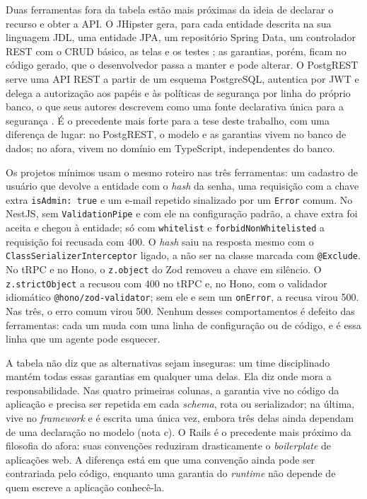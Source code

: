 \documentclass[a4paper,12pt]{article}
\newcommand{\estr}[1]{\textit{#1}}
\begin{document}
Duas ferramentas fora da tabela estão mais próximas da ideia de declarar o recurso e obter a API. O JHipster gera, para cada entidade descrita na sua linguagem JDL, uma entidade JPA, um repositório Spring Data, um controlador REST com o CRUD básico, as telas e os testes \citep{jhipster2026}; as garantias, porém, ficam no código gerado, que o desenvolvedor passa a manter e pode alterar. O PostgREST serve uma API REST a partir de um esquema PostgreSQL, autentica por JWT e delega a autorização aos papéis e às políticas de segurança por linha do próprio banco, o que seus autores descrevem como uma fonte declarativa única para a segurança \citep{postgrest2026}. É o precedente mais forte para a tese deste trabalho, com uma diferença de lugar: no PostgREST, o modelo e as garantias vivem no banco de dados; no afora, vivem no domínio em TypeScript, independentes do banco.

Os projetos mínimos usam o mesmo roteiro nas três ferramentas: um cadastro de usuário que devolve a entidade com o \estr{hash} da senha, uma requisição com a chave extra \texttt{isAdmin: true} e um e-mail repetido sinalizado por um \texttt{Error} comum. No NestJS, sem \texttt{ValidationPipe} e com ele na configuração padrão, a chave extra foi aceita e chegou à entidade; só com \texttt{whitelist} e \texttt{forbidNonWhitelisted} a requisição foi recusada com 400. O \estr{hash} saiu na resposta mesmo com o \texttt{ClassSerializerInterceptor} ligado, a não ser na classe marcada com \texttt{@Exclude}. No tRPC e no Hono, o \texttt{z.object} do Zod removeu a chave em silêncio. O \texttt{z.strictObject} a recusou com 400 no tRPC e, no Hono, com o validador idiomático \texttt{@hono/zod-validator}; sem ele e sem um \texttt{onError}, a recusa virou 500. Nas três, o erro comum virou 500. Nenhum desses comportamentos é defeito das ferramentas: cada um muda com uma linha de configuração ou de código, e é essa linha que um agente pode esquecer.

A tabela não diz que as alternativas sejam inseguras: um time disciplinado mantém todas essas garantias em qualquer uma delas. Ela diz onde mora a responsabilidade. Nas quatro primeiras colunas, a garantia vive no código da aplicação e precisa ser repetida em cada \estr{schema}, rota ou serializador; na última, vive no \estr{framework} e é escrita uma única vez, embora três delas ainda dependam de uma declaração no modelo (nota c). O Rails é o precedente mais próximo da filosofia do afora: suas convenções reduziram drasticamente o \estr{boilerplate} de aplicações web. A diferença está em que uma convenção ainda pode ser contrariada pelo código, enquanto uma garantia do \estr{runtime} não depende de quem escreve a aplicação conhecê-la.
\end{document}
